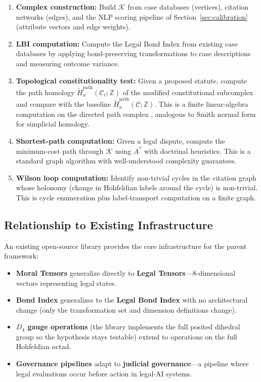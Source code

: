\documentclass[12pt]{article}
\theoremstyle{definition}
\theoremstyle{remark}
\newcommand{\C}{\mathcal{C}}               %
\newcommand{\Z}{\mathbb{Z}}
\begin{document}
\begin{enumerate}
    \item \textbf{Complex construction:} Build $\mathcal{K}$ from case databases (vertices), citation networks (edges), and the NLP scoring pipeline of Section~\ref{sec:calibration} (attribute vectors and edge weights).

    \item \textbf{LBI computation:} Compute the Legal Bond Index from existing case databases by applying bond-preserving transformations to case descriptions and measuring outcome variance.

    \item \textbf{Topological constitutionality test:} Given a proposed statute, compute the path homology $\widetilde{H}_n^{\text{path}}(\C_\ell; \Z)$ of the modified constitutional subcomplex and compare with the baseline $\widetilde{H}_n^{\text{path}}(\C; \Z)$.  This is a finite linear-algebra computation on the directed path complex \cite{grigoryan2014}, analogous to Smith normal form for simplicial homology.

    \item \textbf{Shortest-path computation:} Given a legal dispute, compute the minimum-cost path through $\mathcal{K}$ using $A^*$ with doctrinal heuristics.  This is a standard graph algorithm with well-understood complexity guarantees.

    \item \textbf{Wilson loop computation:} Identify non-trivial cycles in the citation graph whose holonomy (change in Hohfeldian labels around the cycle) is non-trivial.  This is cycle enumeration plus label-transport computation on a finite graph.
\end{enumerate}

\subsection{Relationship to Existing Infrastructure}

An existing open-source library \cite{anon2026b} provides the core infrastructure for the parent framework:

\begin{itemize}
    \item \textbf{Moral Tensors} generalize directly to \textbf{Legal Tensors}---8-dimensional vectors representing legal states.
    \item \textbf{Bond Index} generalizes to the \textbf{Legal Bond Index} with no architectural change (only the transformation set and dimension definitions change).
    \item \textbf{$D_4$ gauge operations} (the library implements the full posited dihedral group so the hypothesis stays testable) extend to operations on the full Hohfeldian octad.
    \item \textbf{Governance pipelines} adapt to \textbf{judicial governance}---a pipeline where legal evaluations occur before action in legal-AI systems.
\end{itemize}
\end{document}
